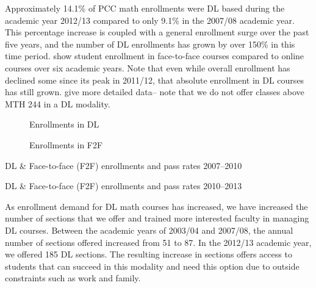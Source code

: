 Approximately 14.1\% of PCC math enrollments were DL based during the
academic year 2012/13 compared to only 9.1\% in the 2007/08 academic year.
This percentage increase is coupled with a general enrollment surge over the
past five years, and the number of DL enrollments has grown by over 150\% in
this time period.  show
student enrollment in face-to-face courses compared to online courses over six
academic years. Note that even while overall enrollment has declined some since
its peak in 2011/12, that absolute enrollment in DL courses has still grown.
 give more detailed data-- 
note that we do not offer classes above MTH 244 in a DL modality.

\begin{figure}[!htb]
    \begin{minipage}{.5\textwidth}
          
          \caption{Enrollments in DL}\label{fig:sec3:DLenrollments}
    \end{minipage}%
    \begin{minipage}{.5\textwidth}
          
          \caption{Enrollments in F2F}\label{fig:sec3:F2Fenrollments}
    \end{minipage}
\end{figure}

\begin{table}[!htb]
	\begin{widepage}
	\centering
  	\caption{DL \& Face-to-face (F2F) enrollments and pass rates 2007--2010}
    \label{tab:sec3:F2FandDLdata2007}
          
          \vspace{2pc}
  	\caption{DL \& Face-to-face (F2F) enrollments and pass rates 2010--2013}
    \label{tab:sec3:F2FandDLdata2010}
          
          \end{widepage}
\end{table}

As enrollment demand for DL math courses has increased, we have increased the
number of sections that we offer and trained more interested faculty in managing
DL courses.  Between the academic years of 2003/04 and 2007/08, the annual
number of sections offered increased from 51 to 87.  In the 2012/13 academic
year, we offered 185 DL sections.   The resulting increase in sections offers
access to students that can succeed in this modality and need this option due to
outside constraints such as work and family.


